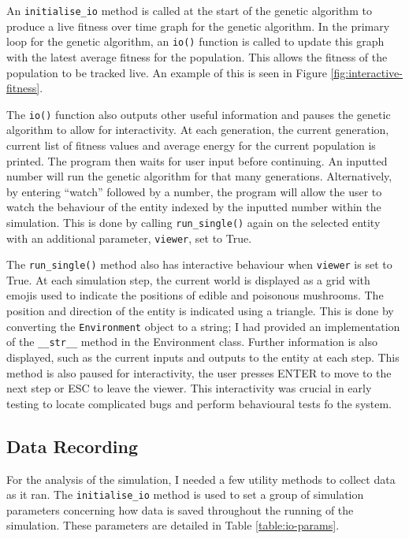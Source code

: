 \documentclass[12pt,a4paper,twoside,openright]{report}
\begin{document}
An \texttt{initialise\_io} method is called at the start of the genetic algorithm to produce a live fitness over time graph for the genetic algorithm. In the primary loop for the genetic algorithm, an \texttt{io()} function is called to update this graph with the latest average fitness for the population. This allows the fitness of the population to be tracked live. An example of this is seen in Figure \ref{fig:interactive-fitness}.

The \texttt{io()} function also outputs other useful information and pauses the genetic algorithm to allow for interactivity. At each generation, the current generation, current list of fitness values and average energy for the current population is printed. The program then waits for user input before continuing. An inputted number will run the genetic algorithm for that many generations. Alternatively, by entering ``watch'' followed by a number, the program will allow the user to watch the behaviour of the entity indexed by the inputted number within the simulation. This is done by calling \texttt{run\_single()} again on the selected entity with an additional parameter, \texttt{viewer}, set to True.

The \texttt{run\_single()} method also has interactive behaviour when \texttt{viewer} is set to True. At each simulation step, the current world is displayed as a grid with emojis used to indicate the positions of edible and poisonous mushrooms. The position and direction of the entity is indicated using a triangle. This is done by converting the \texttt{Environment} object to a string; I had provided an implementation of the \texttt{\_\_str\_\_} method in the Environment class. Further information is also displayed, such as the current inputs and outputs to the entity at each step. This method is also paused for interactivity, the user presses ENTER to move to the next step or ESC to leave the viewer. This interactivity was crucial in early testing to locate complicated bugs and perform behavioural tests fo the system.

\subsection{Data Recording}

For the analysis of the simulation, I needed a few utility methods to collect data as it ran. The \texttt{initialise\_io} method is used to set a group of simulation parameters concerning how data is saved throughout the running of the simulation. These parameters are detailed in Table \ref{table:io-params}.
\end{document}
